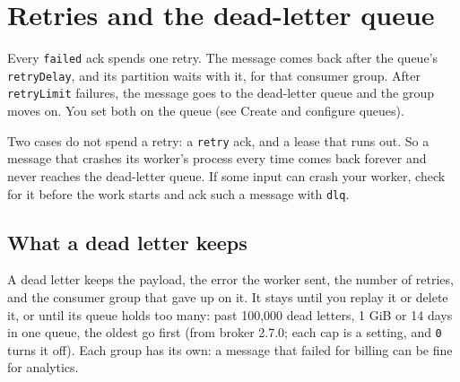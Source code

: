 
\section{Retries and the dead-letter queue}

Every \texttt{failed} ack spends one retry. The message comes back after the queue's
\texttt{retryDelay}, and its partition waits with it, for that consumer group. After
\texttt{retryLimit} failures, the message goes to the dead-letter queue and the group moves on. You
set both on the queue (see Create and configure queues).


Two cases do not spend a retry: a \texttt{retry} ack, and a lease that runs out. So a message that
crashes its worker's process every time comes back forever and never reaches the dead-letter queue.
If some input can crash your worker, check for it before the work starts and ack such a message with
\texttt{dlq}.


\subsection{What a dead letter keeps}

A dead letter keeps the payload, the error the worker sent, the number of retries, and the consumer
group that gave up on it. It stays until you replay it or delete it, or until its queue holds too
many: past 100,000 dead letters, 1 GiB or 14 days in one queue, the oldest go first (from broker
2.7.0; each cap is a setting, and \texttt{0} turns it off). Each group has its own: a message that
failed for billing can be fine for analytics.


